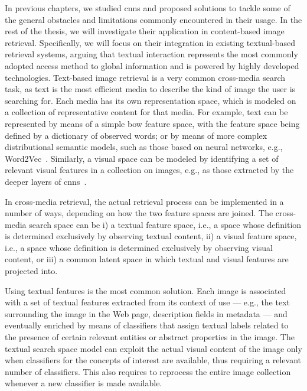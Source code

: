 In previous chapters, we studied \glspl{cnn} and proposed solutions to tackle some of the general obstacles and limitations commonly encountered in their usage.
In the rest of the thesis, we will investigate their application in content-based image retrieval.
Specifically, we will focus on their integration in existing textual-based retrieval systems, arguing that textual interaction represents the most commonly adopted access method to global information and is powered by highly developed technologies.
Text-based image retrieval is a very common cross-media search task, as text is the most efficient media to describe the kind of image the user is searching for.
Each media has its own representation space, which is modeled on a collection of representative content for that media.
For example, text can be represented by means of a simple \acrlong{bow} feature space, with the feature space being defined by a dictionary of observed words; or by means of more complex distributional semantic models, such as those based on neural networks, e.g., Word2Vec~\cite{mikolov2013distributed}.
Similarly, a visual space can be modeled by identifying a set of relevant visual features in a collection on images, e.g., as those extracted by the deeper layers of \glspl{cnn}~\cite{krizhevsky2012imagenet}.

In cross-media retrieval, the actual retrieval process can be implemented in a number of ways, depending on how the two feature spaces are joined.
The cross-media search space can be %
i) a textual feature space, i.e.,  a space whose definition is determined exclusively by observing textual content, %
ii) a visual feature space, i.e.,  a space whose definition is determined exclusively by observing visual content, or %
iii) a common latent space in which textual and visual features are projected into.

Using textual features is the most common solution. %
Each image is associated with a set of textual features extracted from its context of use --- e.g., the text surrounding the image in the Web page, description fields in metadata --- and eventually enriched by means of classifiers that assign textual labels related to the presence of certain relevant entities or abstract properties in the image.
The textual search space model can exploit the actual visual content of the image only when classifiers for the concepts of interest are available, thus requiring a relevant number of classifiers.
This also requires to reprocess the entire image collection whenever a new classifier is made available.

